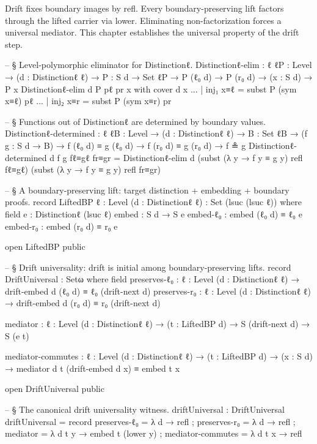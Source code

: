 \documentclass[11pt,a4paper]{book}
\def\texttt#1{#1}%
\begin{document}
Drift fixes boundary images by \texttt{refl}. Every boundary-preserving lift factors through the lifted carrier via \texttt{lower}. Eliminating non-factorization forces a universal mediator. This chapter establishes the universal property of the drift step.

\begin{code}
-- § Level-polymorphic eliminator for Distinctionℓ.
Distinctionℓ-elim :
  {ℓ ℓP : Level} → (d : Distinctionℓ ℓ) →
  {P : S d → Set ℓP} →
  P (ℓ₀ d) →
  P (r₀ d) →
  (x : S d) →
  P x
Distinctionℓ-elim d {P} pℓ pr x with cover d x
... | inj₁ x≡ℓ = subst P (sym x≡ℓ) pℓ
... | inj₂ x≡r = subst P (sym x≡r) pr

-- § Functions out of Distinctionℓ are determined by boundary values.
Distinctionℓ-determined :
  {ℓ ℓB : Level} → (d : Distinctionℓ ℓ) → {B : Set ℓB} →
  (f g : S d → B) →
  f (ℓ₀ d) ≡ g (ℓ₀ d) →
  f (r₀ d) ≡ g (r₀ d) →
  f ≗ g
Distinctionℓ-determined d f g fℓ≡gℓ fr≡gr =
  Distinctionℓ-elim d
    (subst (λ y → f y ≡ g y) refl fℓ≡gℓ)
    (subst (λ y → f y ≡ g y) refl fr≡gr)

-- § A boundary-preserving lift: target distinction + embedding + boundary proofs.
record LiftedBP {ℓ : Level} (d : Distinctionℓ ℓ) : Set (lsuc (lsuc ℓ)) where
  field
    e        : Distinctionℓ (lsuc ℓ)
    embed    : S d → S e
    embed-ℓ₀ : embed (ℓ₀ d) ≡ ℓ₀ e
    embed-r₀ : embed (r₀ d) ≡ r₀ e

open LiftedBP public

-- § Drift universality: drift is initial among boundary-preserving lifts.
record DriftUniversal : Setω where
  field
    preserves-ℓ₀ : {ℓ : Level} (d : Distinctionℓ ℓ) →
      drift-embed d (ℓ₀ d) ≡ ℓ₀ (drift-next d)
    preserves-r₀ : {ℓ : Level} (d : Distinctionℓ ℓ) →
      drift-embed d (r₀ d) ≡ r₀ (drift-next d)

    mediator : {ℓ : Level} (d : Distinctionℓ ℓ) → (t : LiftedBP d) →
      S (drift-next d) → S (e t)

    mediator-commutes : {ℓ : Level} (d : Distinctionℓ ℓ) → (t : LiftedBP d) →
      (x : S d) → mediator d t (drift-embed d x) ≡ embed t x

open DriftUniversal public

-- § The canonical drift universality witness.
driftUniversal : DriftUniversal
driftUniversal = record
  { preserves-ℓ₀ = λ d → refl
  ; preserves-r₀ = λ d → refl
  ; mediator = λ d t y → embed t (lower y)
  ; mediator-commutes = λ d t x → refl
  }
\end{code}
\end{document}
